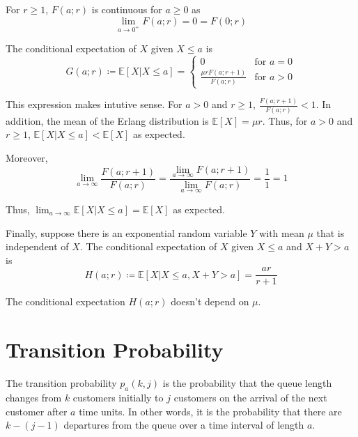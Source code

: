 For $r \geq 1$, $F (a; r)$ is continuous for $a \geq 0$ as
\begin{equation}
	\lim_{a \to 0^{+}} F (a; r) = 0 = F (0; r)
\end{equation}

The conditional expectation of $X$ given $X \leq a$ is
\begin{equation}
	G (a; r) \coloneqq \mathbb{E} [X | X \leq a] = \begin{cases} 0 & \text{for $a = 0$} \\ \frac{\mu r F (a; r + 1)}{F (a; r)} & \text{for $a > 0$} \end{cases}
\end{equation}

This expression makes intutive sense. For $a > 0$ and $r \geq 1$, $\frac{F (a; r + 1)}{F (a; r)} < 1$. In addition, the mean of the Erlang distribution is $\mathbb{E} [X] = \mu r$. Thus, for $a > 0$ and $r \geq 1$, $\mathbb{E} [X | X \leq a] < \mathbb{E} [X]$ as expected.

Moreover, 
\begin{equation}
	\lim_{a \to \infty} \frac{F (a; r + 1)}{F (a; r)} = \frac{\displaystyle \lim_{a \to \infty} F (a; r + 1)}{\displaystyle \lim_{a \to \infty} F (a; r)} = \frac{1}{1} = 1
\end{equation}

Thus, $\displaystyle \lim_{a \to \infty} \mathbb{E} [X | X \leq a] = \mathbb{E} [X]$ as expected.

Finally, suppose there is an exponential random variable $Y$ with mean $\mu$ that is independent of $X$. The conditional expectation of $X$ given $X \leq a$ and $X + Y > a$ is
\begin{equation}
	H (a; r) \coloneqq \mathbb{E} [X | X \leq a, X + Y > a] = \frac{ar}{r + 1}
\end{equation}

The conditional expectation $H (a; r)$ doesn't depend on $\mu$.

\section{Transition Probability}
The transition probability $p_{a} (k, j)$ is the probability that the queue length changes from $k$ customers initially to $j$ customers on the arrival of the next customer after $a$ time units. In other words, it is the probability that there are $k - (j - 1)$ departures from the queue over a time interval of length $a$.

